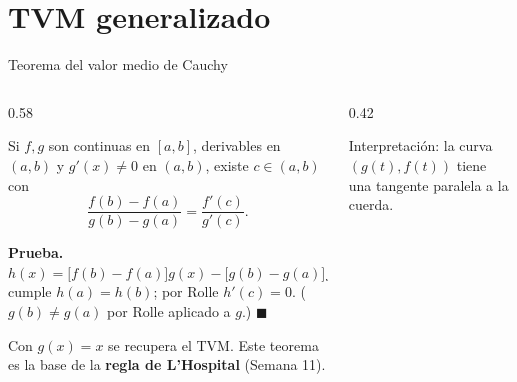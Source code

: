 \documentclass[10pt,aspectratio=169]{beamer}
\begin{document}
\section{TVM generalizado}

\begin{frame}{Teorema del valor medio de Cauchy}
  \begin{columns}
    \begin{column}{0.58\textwidth}
      \begin{teorema}[Cauchy]
        Si $f,g$ son continuas en $[a,b]$, derivables en $(a,b)$ y $g'(x)\ne0$ en $(a,b)$, existe $c\in(a,b)$ con
        \[ \frac{f(b)-f(a)}{g(b)-g(a)}=\frac{f'(c)}{g'(c)}. \]
      \end{teorema}
      \textbf{Prueba.} $h(x)=\big[f(b)-f(a)\big]g(x)-\big[g(b)-g(a)\big]f(x)$ cumple $h(a)=h(b)$; por Rolle $h'(c)=0$. ($g(b)\ne g(a)$ por Rolle aplicado a $g$.) $\blacksquare$
      \begin{observacion}
        Con $g(x)=x$ se recupera el TVM. Este teorema es la base de la \textbf{regla de L'Hospital} (Semana 11).
      \end{observacion}
    \end{column}
    \begin{column}{0.42\textwidth}
      \centering

      \small Interpretación: la curva $(g(t),f(t))$ tiene una tangente paralela a la cuerda.
    \end{column}
  \end{columns}
\end{frame}
\end{document}
